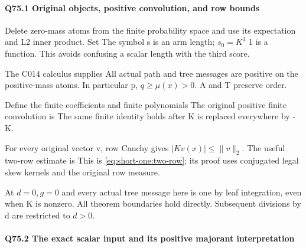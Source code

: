 \paragraph{Q75.1 Original objects, positive convolution, and row bounds}\label{part:Q75.1}

Delete zero-mass atoms from the finite probability space and use its expectation and L2 inner product. Set
The symbol s is an arm length; \(s_0=K^3\) 1 is a function. This avoids
confusing a scalar length with the third score.

The C014 calculus supplies
All actual path and tree messages are positive on the positive-mass
atoms. In particular p, \(q\ge \mu(x)>0.\) A and T preserve order.

Define the finite coefficients and finite polynomials
The original positive finite convolution is
The same finite identity holds after K is replaced everywhere by -K.


For every original vector v, row Cauchy gives \(|Kv(x)|\le \lVert v\rVert _2.\)
The useful two-row estimate is
This is \eqref{eq:short-one:two-row}; its proof uses conjugated legal skew kernels and the original row measure.

At \(d=0,\allowbreak  g=0\) and every actual tree message here is one by leaf integration,
even when K is nonzero. All theorem boundaries hold directly. Subsequent
divisions by d are restricted to \(d>0.\)

\paragraph{Q75.2 The exact scalar input and its positive majorant interpretation}

